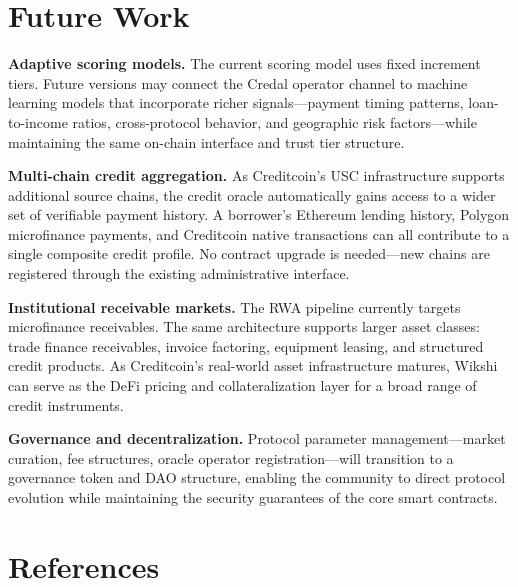 \documentclass[11pt,a4paper]{article}
\begin{document}
\section{Future Work}

\textbf{Adaptive scoring models.} The current scoring model uses fixed increment tiers. Future versions may connect the Credal operator channel to machine learning models that incorporate richer signals---payment timing patterns, loan-to-income ratios, cross-protocol behavior, and geographic risk factors---while maintaining the same on-chain interface and trust tier structure.

\textbf{Multi-chain credit aggregation.} As Creditcoin's USC infrastructure supports additional source chains, the credit oracle automatically gains access to a wider set of verifiable payment history. A borrower's Ethereum lending history, Polygon microfinance payments, and Creditcoin native transactions can all contribute to a single composite credit profile. No contract upgrade is needed---new chains are registered through the existing administrative interface.

\textbf{Institutional receivable markets.} The RWA pipeline currently targets microfinance receivables. The same architecture supports larger asset classes: trade finance receivables, invoice factoring, equipment leasing, and structured credit products. As Creditcoin's real-world asset infrastructure matures, Wikshi can serve as the DeFi pricing and collateralization layer for a broad range of credit instruments.

\textbf{Governance and decentralization.} Protocol parameter management---market curation, fee structures, oracle operator registration---will transition to a governance token and DAO structure, enabling the community to direct protocol evolution while maintaining the security guarantees of the core smart contracts.


\renewcommand{\refname}{}
\section*{References}
\vspace{-2em}
\end{document}
